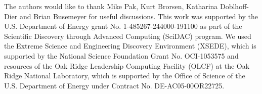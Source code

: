 The authors would like to thank Mike Pak, Kurt Brorsen, Katharina Doblhoff-Dier and Brian Busemeyer for useful discussions. This work was supported by the U.S. Department of Energy grant No. 1-485267-244000-191100 as part of the Scientific Discovery through Advanced Computing (SciDAC) program. We used the Extreme Science and Engineering Discovery Environment (XSEDE), which is supported by the National Science Foundation Grant No. OCI-1053575 and resources of the Oak Ridge Leadership Computing Facility (OLCF) at the Oak Ridge National Laboratory, which is supported by the Office of Science of the U.S. Department of Energy under Contract No. DE-AC05-00OR22725.